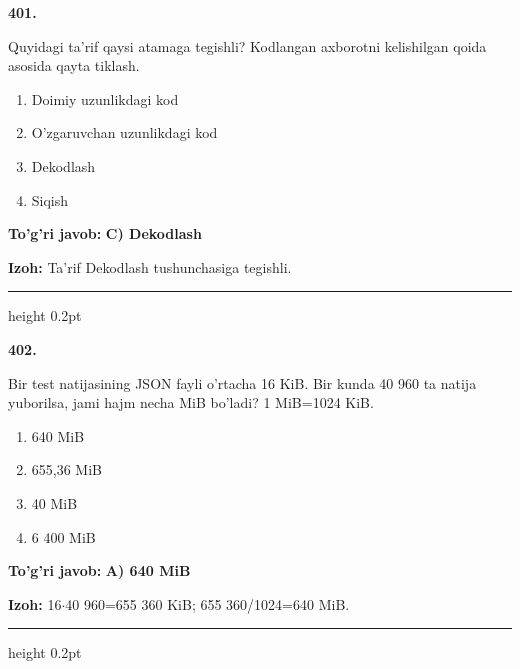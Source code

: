 \documentclass[10pt,a4paper,oneside]{article}
\begin{document}
\noindent\textbf{\color{ink}401.}
\par
Quyidagi ta'rif qaysi atamaga tegishli? Kodlangan axborotni kelishilgan qoida asosida qayta tiklash.
\begin{enumerate}[label=\Alph*),leftmargin=9mm]
\item Doimiy uzunlikdagi kod
\item O'zgaruvchan uzunlikdagi kod
\item Dekodlash
\item Siqish
\end{enumerate}
\begin{tcolorbox}[enhanced,breakable,colback=teal!4,colframe=teal!50!black,boxrule=0.5pt,arc=1.1mm,left=3mm,right=3mm,top=1.7mm,bottom=1.7mm,before skip=2mm,after skip=2mm]
\textbf{\color{teal}To'g'ri javob:} \textbf{C) Dekodlash}
\par\smallskip
\textbf{Izoh:} Ta'rif Dekodlash tushunchasiga tegishli.
\end{tcolorbox}
\vspace{2mm}\hrule height 0.2pt \vspace{3mm}

\noindent\textbf{\color{ink}402.}
\par
Bir test natijasining JSON fayli o'rtacha 16 KiB. Bir kunda 40 960 ta natija yuborilsa, jami hajm necha MiB bo'ladi? 1 MiB=1024 KiB.
\begin{enumerate}[label=\Alph*),leftmargin=9mm]
\item 640 MiB
\item 655,36 MiB
\item 40 MiB
\item 6 400 MiB
\end{enumerate}
\begin{tcolorbox}[enhanced,breakable,colback=teal!4,colframe=teal!50!black,boxrule=0.5pt,arc=1.1mm,left=3mm,right=3mm,top=1.7mm,bottom=1.7mm,before skip=2mm,after skip=2mm]
\textbf{\color{teal}To'g'ri javob:} \textbf{A) 640 MiB}
\par\smallskip
\textbf{Izoh:} 16\ensuremath{\cdot}40 960=655 360 KiB; 655 360/1024=640 MiB.
\end{tcolorbox}
\vspace{2mm}\hrule height 0.2pt \vspace{3mm}
\end{document}
